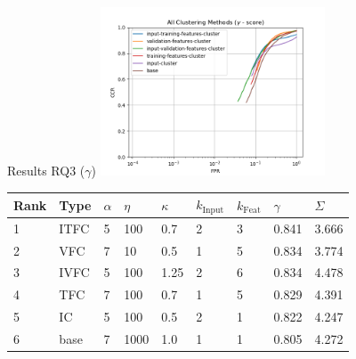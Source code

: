 \begin{frame}{Results RQ3 ($\gamma$)}
	\centering
	\includegraphics[width=0.5\textwidth]{figures/all_methods_gamma.png}
	\footnotesize{
		\begin{tabularx}{\textwidth}{ |X|X|X|X|X|X|X|X|X| }
			\hline
			Rank & Type & $\alpha$ & $\eta$ & $\kappa$ & $k_{\text{Input}}$ & $k_{\text{Feat}}$ & $\gamma$ & $\Sigma$ \\
			\hline
			1    & ITFC & 5        & 100    & 0.7      & 2                  & 3                 & 0.841    & 3.666    \\
			2    & VFC  & 7        & 10     & 0.5      & 1                  & 5                 & 0.834    & 3.774    \\
			3    & IVFC & 5        & 100    & 1.25     & 2                  & 6                 & 0.834    & 4.478    \\
			4    & TFC  & 7        & 100    & 0.7      & 1                  & 5                 & 0.829    & 4.391    \\
			5    & IC   & 5        & 100    & 0.5      & 2                  & 1                 & 0.822    & 4.247    \\
			6    & base & 7        & 1000   & 1.0      & 1                  & 1                 & 0.805    & 4.272    \\
			\hline
		\end{tabularx}
	}

\end{frame}

